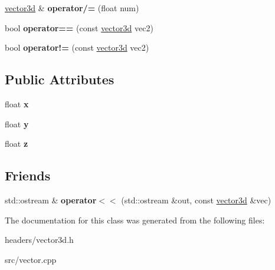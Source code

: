 \begin{DoxyCompactItemize}
\item 
\hypertarget{classvector3d_a709f1795205065ef0fbf063b4f33833b}{\hyperlink{classvector3d}{vector3d} \& {\bfseries operator/=} (float num)}\label{classvector3d_a709f1795205065ef0fbf063b4f33833b}

\item 
\hypertarget{classvector3d_a9fd0e0eeea52ea6fa247a7c71c57ddd3}{bool {\bfseries operator==} (const \hyperlink{classvector3d}{vector3d} vec2)}\label{classvector3d_a9fd0e0eeea52ea6fa247a7c71c57ddd3}

\item 
\hypertarget{classvector3d_a0a0be1e8a16e12acaff22d31e482f3c8}{bool {\bfseries operator!=} (const \hyperlink{classvector3d}{vector3d} vec2)}\label{classvector3d_a0a0be1e8a16e12acaff22d31e482f3c8}

\end{DoxyCompactItemize}
\subsection*{Public Attributes}
\begin{DoxyCompactItemize}
\item 
\hypertarget{classvector3d_add24ba608397ce7664f51369fc6a1ba4}{float {\bfseries x}}\label{classvector3d_add24ba608397ce7664f51369fc6a1ba4}

\item 
\hypertarget{classvector3d_a64dec3fa34e765f42a7c716dbc4559d2}{float {\bfseries y}}\label{classvector3d_a64dec3fa34e765f42a7c716dbc4559d2}

\item 
\hypertarget{classvector3d_a4e5e948ffcf14e91ebec29e889ced5be}{float {\bfseries z}}\label{classvector3d_a4e5e948ffcf14e91ebec29e889ced5be}

\end{DoxyCompactItemize}
\subsection*{Friends}
\begin{DoxyCompactItemize}
\item 
\hypertarget{classvector3d_a9f8090eeefa0cd1dde557bb5ab60009f}{std\+::ostream \& {\bfseries operator$<$$<$} (std\+::ostream \&out, const \hyperlink{classvector3d}{vector3d} \&vec)}\label{classvector3d_a9f8090eeefa0cd1dde557bb5ab60009f}

\end{DoxyCompactItemize}


The documentation for this class was generated from the following files\+:\begin{DoxyCompactItemize}
\item 
headers/vector3d.\+h\item 
src/vector.\+cpp\end{DoxyCompactItemize}
